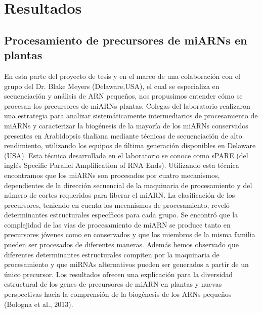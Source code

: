 \section{Resultados} 

\subsection[]{Procesamiento de precursores de miARNs en plantas}

En esta parte del proyecto de tesis y en el marco de una colaboración con el grupo del Dr. Blake Meyers (Delaware,USA), el cual se especializa en secuenciación y análisis de ARN pequeños, nos propusimos entender cómo se procesan los precursores de miARNs plantas. 
Colegas del laboratorio realizaron una estrategia para analizar sistemáticamente intermediarios de procesamiento de miARNs y caracterizar la biogénesis de la mayoría de los miARNs conservados presentes en Arabidopsis thaliana mediante técnicas de secuenciación de alto rendimiento, utilizando los equipos de última generación disponibles en Delaware (USA).
Esta técnica desarrollada en el laboratorio se conoce como sPARE \citep{Schapire2013} (del inglés Specific Parallel Amplification of RNA Ends).
Utilizando esta técnica encontramos que los miARNs son procesados por cuatro mecanismos, dependientes de la dirección secuencial de la maquinaria de procesamiento y del número de cortes requeridos para liberar el miARN.
La clasificación de los precursores, teniendo en cuenta los mecanismos de procesamiento, reveló determinantes estructurales específicos para cada grupo.
Se encontró que la complejidad de las vías de procesamiento de miARN se produce tanto en precursores jóvenes como en conservados y que los miembros de la misma familia pueden ser procesados de diferentes maneras.
Además hemos observado que diferentes determinantes estructurales compiten por la maquinaria de procesamiento y que miRNAs alternativos pueden ser generados a partir de un único precursor.
Los resultados ofrecen una explicación para la diversidad estructural de los genes de precursores de miARN en plantas y nuevas perspectivas hacia la comprensión de la biogénesis de los ARNs pequeños (Bologna et al., 2013).


